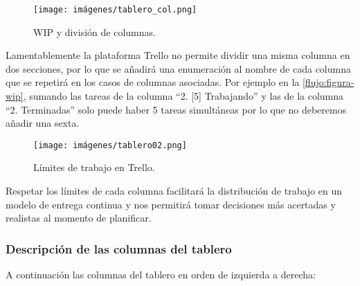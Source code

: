 \begin{figure}[H]
	\centering
	\caption{WIP y división de columnas.}
	\label{flujo:figura-col}
	\texttt{[image: imágenes/tablero\_col.png]}
\end{figure}

Lamentablemente la plataforma Trello no permite dividir una misma columna en dos secciones, por lo que se añadirá una enumeración al nombre de cada columna que se repetirá en los casos de columnas asociadas. Por ejemplo en la \autoref{flujo:figura-wip}, sumando las tareas de la columna “2. [5] Trabajando” y las de la columna “2. Terminadas” solo puede haber 5 tareas simultáneas por lo que no deberemos añadir una sexta.

\begin{figure}[h]
	\centering
	\caption{Límites de trabajo en Trello.}
	\label{flujo:figura-wip}
	\texttt{[image: imágenes/tablero02.png]}
\end{figure}

Respetar los límites de cada columna facilitará la distribución de trabajo en un modelo de entrega continua y nos permitirá tomar decisiones más acertadas y realistas al momento de planificar.

\subsubsection{Descripción de las columnas del tablero}\label{flujo:descripcion-de-columnas}
A continuación las columnas del tablero en orden de izquierda a derecha:

